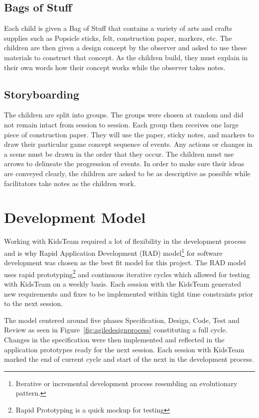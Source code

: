 \subsection{Bags of Stuff} \label{sec:bagsofstuff}
Each child is given a Bag of Stuff that contains a variety of arts and crafts supplies such as Popsicle sticks, felt, construction paper, markers, etc. The children are then given a design concept by the observer and asked to use these materials to construct that concept. As the children build, they must explain in their own words how their concept works while the observer takes notes. \cite{Druin:1999:CID:302979.303166}\cite{Druin02therole}

\subsection{Storyboarding}\label{sec:storyboarding}

The children are split into groups. The groups were chosen at random and did not remain intact from session to session. Each group then receives one large piece of construction paper. They will use the paper, sticky notes, and markers to draw their particular game concept sequence of events. Any actions or changes in a scene must be drawn in the order that they occur. The children must use arrows to delineate the progression of events. In order to make sure their ideas are conveyed clearly, the children are asked to be as descriptive as possible while facilitators take notes as the children work. \cite{Druin:1999:CID:302979.303166}\cite{Druin02therole}

\section{Development Model}
Working with KidsTeam required a lot of flexibility in the development process and is why Rapid Application Development (RAD) model\footnote{Iterative or incremental development process resembling an evolutionary pattern.} for software development was chosen as the best fit model for this project. The RAD model uses rapid prototyping\footnote{Rapid Prototyping is a quick mockup for testing} and continuous iterative cycles which allowed for testing with KidsTeam on a weekly basis. Each session with the KidsTeam generated new requirements and fixes to be implemented within tight time constraints prior to the next session.

The model centered around five phases Specification, Design, Code, Test and Review as seen in Figure~\ref{fig:agiledesignprocess} constituting a full cycle. Changes in the specification were then implemented and reflected in the application prototypes ready for the next session. Each session with KidsTeam marked the end of current cycle and start of the next in the development process. \cite{0136061699}\cite{Ruparelia:2010:SDL:1764810.1764814}

